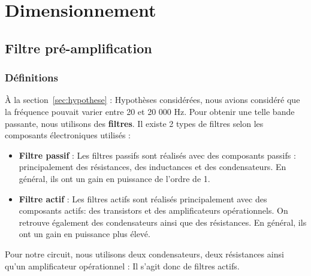 \documentclass[10pt, oneside, a4paper]{article}
\begin{document}
\section{Dimensionnement}

\subsection{Filtre pré-amplification}
\subsubsection{Définitions}
À la section~\ref{sec:hypothese} : \og Hypothèses considérées\fg, nous avions considéré que la fréquence pouvait varier entre 20 et 20 000 Hz. Pour obtenir une telle bande passante, nous utilisons des \textbf{filtres}. Il existe 2 types de filtres selon les composants électroniques utilisés : 
\begin{itemize}
\item \textbf{Filtre passif} : Les filtres passifs sont réalisés avec des composants passifs : principalement des résistances, des inductances et des condensateurs. En général, ils ont un gain en puissance de l'ordre de 1.
\item \textbf{Filtre actif} : Les filtres actifs sont réalisés principalement avec des composants actifs: des transistors et des amplificateurs opérationnels. On retrouve également des condensateurs ainsi que des résistances. En général, ils ont un gain en puissance plus élevé.
\end{itemize}
Pour notre circuit, nous utilisons deux condensateurs, deux résistances ainsi qu'un amplificateur opérationnel : Il s'agit donc de filtres actifs. 
\end{document}
